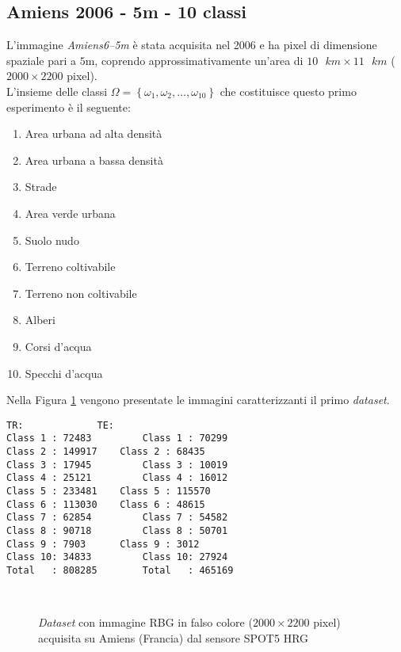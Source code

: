 \subsection{Amiens 2006 - 5m - 10 classi}
L'immagine \emph{Amiens6--5m} è stata acquisita nel 2006 e ha pixel di dimensione spaziale pari a $5 \text{m}$, coprendo approssimativamente un'area di $10\text{ }km\times11\text{ }km$ ($2000\times2200$ pixel).\\
L'insieme delle classi $\Omega=\left\lbrace\omega_1,\omega_2,\ldots,\omega_{10}\right\rbrace$ che costituisce questo primo esperimento è il seguente:
\begin{enumerate}
\item Area urbana ad alta densità
\item Area urbana a bassa densità
\item Strade
\item Area verde urbana 
\item Suolo nudo
\item Terreno coltivabile
\item Terreno non coltivabile 
\item Alberi
\item Corsi d'acqua
\item Specchi d'acqua
\end{enumerate}
Nella Figura \ref{fig: Amiens65m} vengono presentate le immagini caratterizzanti il primo \emph{dataset}. 
\begin{lstlisting}[float=b,title={Distribuzione dei pixel di training (TR) e test (TS) classe per classe.},
                   label=lst:esempio, frame=lines]
TR:				TE:
Class 1 : 72483 		Class 1 : 70299
Class 2 : 149917 	Class 2 : 68435
Class 3 : 17945 		Class 3 : 10019
Class 4 : 25121 		Class 4 : 16012
Class 5 : 233481 	Class 5 : 115570
Class 6 : 113030 	Class 6 : 48615
Class 7 : 62854 		Class 7 : 54582
Class 8 : 90718 		Class 8 : 50701
Class 9 : 7903 		Class 9 : 3012
Class 10: 34833 		Class 10: 27924
Total   : 808285		Total   : 465169
\end{lstlisting}
\clearpage
\begin{figure}[!ht]
   \center
   \\%
     \hspace{4mm}
    \caption{\emph{Dataset} con immagine RBG in falso colore ($2000\times2200$ pixel) acquisita su Amiens (Francia) dal sensore \textsc{SPOT5 HRG}}
    \label{fig: Amiens65m}
  \end{figure}
  
